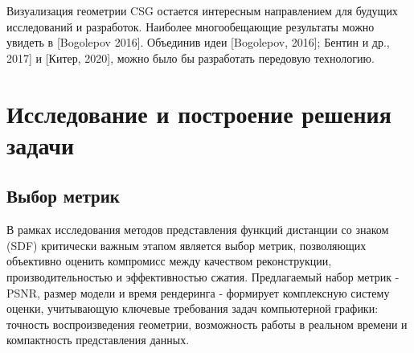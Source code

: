 \documentclass[a4paper,hidelinks,12pt]{article}
\begin{document}
Визуализация геометрии CSG остается интересным направлением для будущих исследований и разработок. 
Наиболее многообещающие результаты можно увидеть в [Bogolepov 2016]. Объединив идеи [Bogolepov, 2016]; Бентин и др., 2017] и [Китер, 2020], можно было бы разработать передовую технологию.

\newpage

\section{Исследование и построение решения задачи}

\subsection{Выбор метрик}

В рамках исследования методов представления функций дистанции со знаком (SDF) критически 
важным этапом является выбор метрик, позволяющих объективно оценить компромисс между качеством 
реконструкции, производительностью и эффективностью сжатия. Предлагаемый набор метрик - PSNR, 
размер модели и время рендеринга - формирует комплексную систему оценки, учитывающую ключевые 
требования задач компьютерной графики: точность воспроизведения геометрии, возможность работы в 
реальном времени и компактность представления данных.
\end{document}
